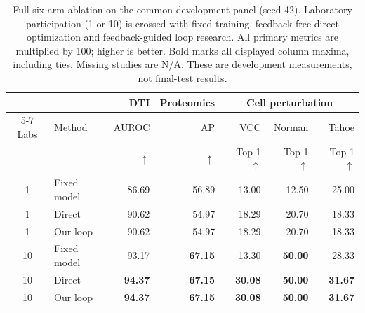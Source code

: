 \begin{table}[t]
\centering\small
\setlength{\tabcolsep}{4pt}
\begin{tabular}{clrrrrr}
\toprule
 & & DTI & Proteomics & \multicolumn{3}{c}{Cell perturbation} \\
\cmidrule(lr){5-7}
Labs & Method & AUROC & AP & VCC & Norman & Tahoe \\
 & & $\uparrow$ & $\uparrow$ & Top-1 $\uparrow$ & Top-1 $\uparrow$ & Top-1 $\uparrow$ \\
\midrule
1 & Fixed model & 86.69 & 56.89 & 13.00 & 12.50 & 25.00 \\
1 & Direct & 90.62 & 54.97 & 18.29 & 20.70 & 18.33 \\
1 & Our loop & 90.62 & 54.97 & 18.29 & 20.70 & 18.33 \\
\midrule
10 & Fixed model & 93.17 & \textbf{67.15} & 13.30 & \textbf{50.00} & 28.33 \\
10 & Direct & \textbf{94.37} & \textbf{67.15} & \textbf{30.08} & \textbf{50.00} & \textbf{31.67} \\
10 & Our loop & \textbf{94.37} & \textbf{67.15} & \textbf{30.08} & \textbf{50.00} & \textbf{31.67} \\
\bottomrule
\end{tabular}
\caption{Full six-arm ablation on the common development panel (seed 42). Laboratory participation (1 or 10) is crossed with fixed training, feedback-free direct optimization and feedback-guided loop research. All primary metrics are multiplied by 100; higher is better. Bold marks all displayed column maxima, including ties. Missing studies are N/A. These are development measurements, not final-test results.}
\label{tab:unified-ablation}
\end{table}
